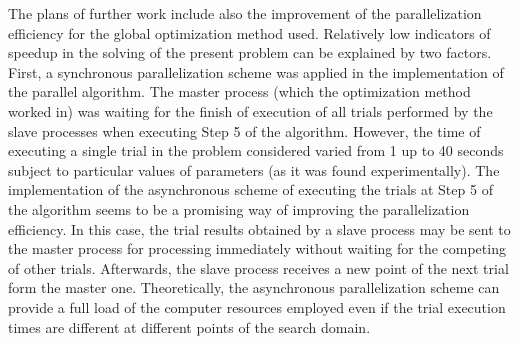 \documentclass{svproc}
\begin{document}

The plans of further work include also the improvement of the parallelization efficiency for the global optimization method used. Relatively low indicators of speedup in the solving of the present problem can be explained by two factors. First, a synchronous parallelization scheme was applied in the implementation of the parallel algorithm. The master process (which the optimization method worked in) was waiting for the finish of execution of all trials performed by the slave processes when executing Step 5 of the algorithm. However, the time of executing  a single trial in the problem considered varied from 1 up to 40 seconds subject to particular values of parameters (as it was found experimentally). The implementation of the asynchronous scheme of executing the trials at Step 5 of the algorithm seems to be a promising way of improving the parallelization efficiency. 
In this case, the trial results obtained by a slave process may be sent to the master process for processing immediately without waiting for the competing of other trials. Afterwards, the slave process receives a new point of the next trial form the master one. Theoretically, the asynchronous parallelization scheme can provide a full load of the computer resources employed even if the trial execution times are different at different points of the search domain. 
\end{document}
